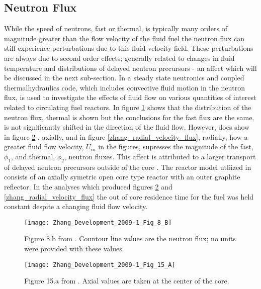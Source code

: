 \documentclass[review]{elsarticle}
\begin{document}
\subsection{Neutron Flux} \label{flux}
While the speed of neutrons, fast or thermal, is typically many orders of magnitude greater than
the flow velocity of the fluid fuel the neutron flux can still experience
perturbations due to this fluid velocity field. These perturbations are always
due to second order effects; generally related to changes in fluid temperature
and distributions of delayed neutron precursors - an affect which will be
discussed in the next sub-section. In \cite{zhang_development_2009-1} a steady
state neutronics and coupled thermalhydraulics code, which includes convective
fluid motion in the neutron flux, is used to investigate the effects of fluid
flow on various quantities of interest related to circulating fuel reactors. In
figure \ref{zhang_2d_flux} \cite{zhang_development_2009-1} shows that the
distribution of the neutron flux, thermal is shown but the conclusions for the fast flux are the same, is not significantly shifted in the direction
of the fluid flow. However, \cite{zhang_development_2009-1} does show in figure \ref{zhang_axial_velocity_flux}
, axially, and in figure \ref{zhang_radial_velocity_flux}, radially, how a greater fluid flow
 velocity, $U_{in}$ in the figures, supresses the magnitude of the fast, $\phi_{1}$, and thermal, $\phi_{2}$, neutron fluxes. This affect is
 attributed to a larger transport of delayed neutron precursors outside of the core \cite{zhang_development_2009-1}. The reactor model
 utliized in \cite{zhang_development_2009-1} consists of an axially symetric
 open core type reactor with an outer graphite reflector. In the analyses which
 produced figures \ref{zhang_axial_velocity_flux} and \ref{zhang_radial_velocity_flux} the
 out of core residence time for the fuel was held constant despite a changing
 fluid flow velocity.

\begin{figure}[h]
   \label{zhang_2d_flux}
   \centering
   \texttt{[image: Zhang\_Development\_2009-1\_Fig\_8\_B]}
   \caption{Figure 8.b from \cite{zhang_development_2009-1}. Countour line
    values are the neutron flux; no units were provided with these values.} 
\end{figure}

\begin{figure}[h]
   \label{zhang_axial_velocity_flux}
   \centering
   \texttt{[image: Zhang\_Development\_2009-1\_Fig\_15\_A]}
   \caption{Figure 15.a from \cite{zhang_development_2009-1}. 
               Axial
               values are taken at the center of the core.}
\end{figure}
\end{document}
